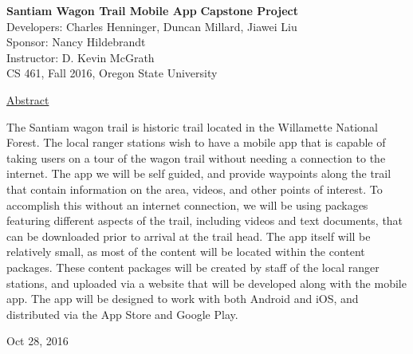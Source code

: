 \documentclass[letterpaper, 10pt,titlepage]{article}
\begin{document}
\begin{titlepage}
\begin{center}
    \Huge
    \textbf{Santiam Wagon Trail Mobile App}
    \textbf{Capstone Project}\\
    \vspace{1.0cm}
    \large
    Developers: Charles Henninger, Duncan Millard, Jiawei Liu\\
    Sponsor: Nancy Hildebrandt\\
    \vspace{1.5cm}
    \large
    Instructor: D. Kevin McGrath\\

    \large
    CS 461, Fall 2016, Oregon State University\\
    
    \vspace{0.5cm}

    \vspace{2.5cm}
    \large
    \underline{Abstract}\\
    \vspace{0.3cm}
    \end{center}
    \large
    
    The Santiam wagon trail is historic trail located in the Willamette National Forest. The local ranger stations wish to have a mobile app that is capable of taking users on a tour of the wagon trail without needing a connection to the internet. The app we will be self guided, and provide waypoints along the trail that contain information on the area, videos, and other points of interest. To accomplish this without an internet connection, we will be using packages featuring different aspects of the trail, including videos and text documents, that can be downloaded prior to arrival at the trail head. The app itself will be relatively small, as most of the content will be located within the content packages.  These content packages will be created by staff of the local ranger stations, and uploaded via a website that will be developed along with the mobile app. The app will be designed to work with both Android and iOS, and distributed via the App Store and Google Play.


    
    \vspace{0.8cm}
    \vfill
    
\begin{center}    
    Oct 28, 2016

\end{center}
\end{titlepage}
\end{document}
